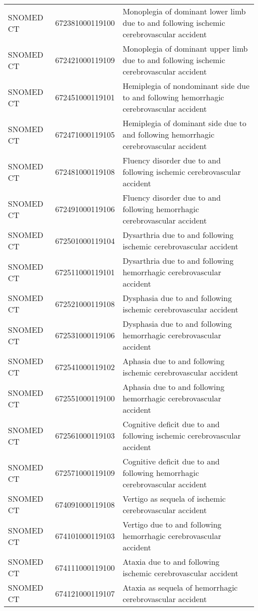 \begin{longtable}{p{}p{}p{}}
  SNOMED CT & 672381000119100 & Monoplegia of dominant lower limb due to and following ischemic cerebrovascular accident \\ 
  SNOMED CT & 672421000119109 & Monoplegia of dominant upper limb due to and following ischemic cerebrovascular accident \\ 
  SNOMED CT & 672451000119101 & Hemiplegia of nondominant side due to and following hemorrhagic cerebrovascular accident \\ 
  SNOMED CT & 672471000119105 & Hemiplegia of dominant side due to and following hemorrhagic cerebrovascular accident \\ 
  SNOMED CT & 672481000119108 & Fluency disorder due to and following ischemic cerebrovascular accident \\ 
  SNOMED CT & 672491000119106 & Fluency disorder due to and following hemorrhagic cerebrovascular accident \\ 
  SNOMED CT & 672501000119104 & Dysarthria due to and following ischemic cerebrovascular accident \\ 
  SNOMED CT & 672511000119101 & Dysarthria due to and following hemorrhagic cerebrovascular accident \\ 
  SNOMED CT & 672521000119108 & Dysphasia due to and following ischemic cerebrovascular accident \\ 
  SNOMED CT & 672531000119106 & Dysphasia due to and following hemorrhagic cerebrovascular accident \\ 
  SNOMED CT & 672541000119102 & Aphasia due to and following ischemic cerebrovascular accident \\ 
  SNOMED CT & 672551000119100 & Aphasia due to and following hemorrhagic cerebrovascular accident \\ 
  SNOMED CT & 672561000119103 & Cognitive deficit due to and following ischemic cerebrovascular accident \\ 
  SNOMED CT & 672571000119109 & Cognitive deficit due to and following hemorrhagic cerebrovascular accident \\ 
  SNOMED CT & 674091000119108 & Vertigo as sequela of ischemic cerebrovascular accident \\ 
  SNOMED CT & 674101000119103 & Vertigo due to and following hemorrhagic cerebrovascular accident \\ 
  SNOMED CT & 674111000119100 & Ataxia due to and following ischemic cerebrovascular accident \\ 
  SNOMED CT & 674121000119107 & Ataxia as sequela of hemorrhagic cerebrovascular accident \\ 

\end{longtable}
